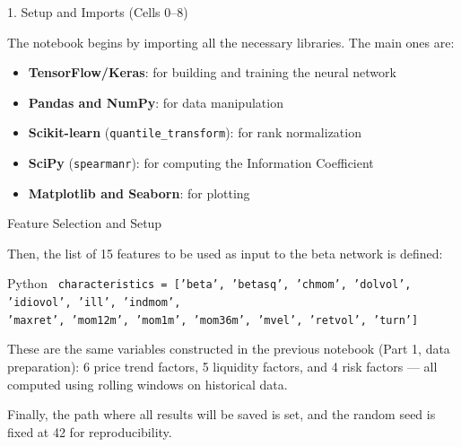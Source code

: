 \documentclass[aspectratio=169, 11pt]{beamer}
\begin{document}
%
%
\begin{frame}{1. Setup and Imports (Cells 0--8)}

The notebook begins by importing all the necessary libraries. The main ones are:

\vspace{0.3cm}

\begin{itemize}
    \item \textbf{TensorFlow/Keras}: for building and training the neural network
    \item \textbf{Pandas and NumPy}: for data manipulation
    \item \textbf{Scikit-learn} (\texttt{quantile\_transform}): for rank normalization
    \item \textbf{SciPy} (\texttt{spearmanr}): for computing the Information Coefficient
    \item \textbf{Matplotlib and Seaborn}: for plotting
\end{itemize}

\end{frame}
%
%
\begin{frame}{Feature Selection and Setup}

Then, the list of 15 features to be used as input to the beta network is defined:

\vspace{0.3cm}

\begin{block}{Python}
\small
\texttt{
characteristics = ['beta', 'betasq', 'chmom', 'dolvol', 'idiovol', 'ill', 'indmom', \\
\hspace{1.2cm} 'maxret', 'mom12m', 'mom1m', 'mom36m', 'mvel', 'retvol', 'turn']
}
\end{block}

\vspace{0.3cm}

These are the same variables constructed in the previous notebook (Part 1, data preparation): 6 price trend factors, 5 liquidity factors, and 4 risk factors — all computed using rolling windows on historical data.

\vspace{0.3cm}

Finally, the path where all results will be saved is set, and the random seed is fixed at 42 for reproducibility.

\end{frame}
\end{document}
